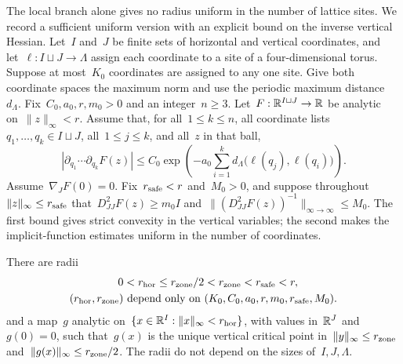 The local branch alone gives no radius uniform in the number of lattice sites. We record a sufficient uniform version with an explicit bound on the inverse vertical Hessian. Let~$I$ and~$J$ be finite sets of horizontal and vertical coordinates, and let~$\ell:I\sqcup J\to\Lambda$ assign each coordinate to a site of a four-dimensional torus. Suppose at most~$K_0$ coordinates are assigned to any one site. Give both coordinate spaces the maximum norm and use the periodic maximum distance~$d_\Lambda$. Fix~$C_0,a_0,r,m_0>0$ and an integer~$n\ge3$. Let~$F:\mathbb R^{I\sqcup J}\to\mathbb R$ be analytic on~$\|z\|_\infty<r$. Assume that, for all~$1\le k\le n$, all coordinate lists~$q_1,\ldots,q_k\in I\sqcup J$, all~$1\le j\le k$, and all~$z$ in that ball,
\begin{equation}\label{eq:uv-local-derivative-decay}
 \left|\partial_{q_1}\cdots\partial_{q_k}F(z)\right|
 \le C_0\exp\!\left(-a_0\sum_{i=1}^k
       d_\Lambda\bigl(\ell(q_j),\ell(q_i)\bigr)\right).
\end{equation}
Assume~$\nabla_JF(0)=0$. Fix~$r_{\rm safe}<r$ and~$M_0>0$, and suppose throughout~$\|z\|_\infty\le r_{\rm safe}$ that~$D^2_{JJ}F(z)\ge m_0 I$ and~$\|(D^2_{JJ}F(z))^{-1}\|_{\infty\to\infty}\le M_0$. The first bound gives strict convexity in the vertical variables; the second makes the implicit-function estimates uniform in the number of coordinates.
\begin{proposition}\label{prop:uv-uniform-branch}
There are radii
\begin{equation}\label{eq:uv-uniform-radii}
 \begin{aligned}
 0&<r_{\rm hor}\le r_{\rm zone}/2<r_{\rm zone}<r_{\rm safe}<r,\\
 (r_{\rm hor},r_{\rm zone})&\text{ depend only on }(K_0,C_0,a_0,r,m_0,r_{\rm safe},M_0).
 \end{aligned}
\end{equation}
and a map~$g$ analytic on~$\{x\in\mathbb R^I:\|x\|_\infty<r_{\rm hor}\}$, with values in~$\mathbb R^J$ and~$g(0)=0$, such that~$g(x)$ is the unique vertical critical point in~$\|y\|_\infty\le r_{\rm zone}$ and~$\|g(x)\|_\infty\le r_{\rm zone}/2$. The radii do not depend on the sizes of~$I,J,\Lambda$.
\end{proposition}

